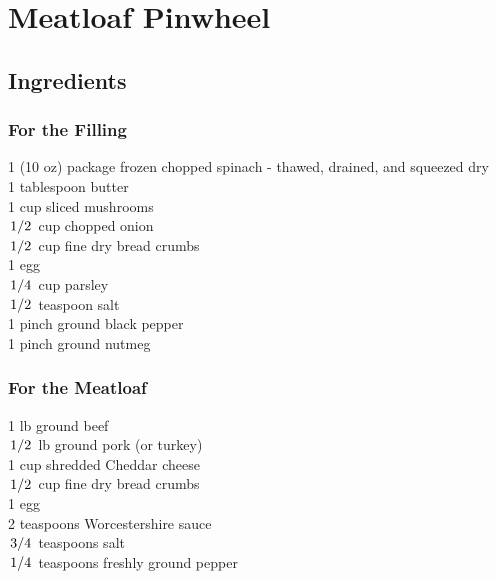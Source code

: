 \documentclass{article}
\begin{document}
\newcommand{\slfrac}[2]{\left.#1\middle/#2\right.}
\newcommand{\degree}{\ensuremath{^\circ}}

\section*{Meatloaf Pinwheel}



\subsection*{Ingredients}
\subsubsection*{For the Filling}

1 (10 oz) package frozen chopped spinach - thawed, drained, and squeezed dry\\
1 tablespoon butter\\
1 cup sliced mushrooms\\
$\slfrac{1}{2}$ cup chopped onion\\
$\slfrac{1}{2}$ cup fine dry bread crumbs\\
1 egg\\
$\slfrac{1}{4}$ cup parsley\\
$\slfrac{1}{2}$ teaspoon salt\\
1 pinch ground black pepper\\
1 pinch ground nutmeg\\

\subsubsection*{For the Meatloaf}

1 lb ground beef\\
$\slfrac{1}{2}$ lb ground pork (or turkey)\\
1 cup shredded Cheddar cheese\\
$\slfrac{1}{2}$ cup fine dry bread crumbs\\
1 egg\\
2 teaspoons Worcestershire sauce\\
$\slfrac{3}{4}$ teaspoons salt\\
$\slfrac{1}{4}$ teaspoons freshly ground pepper\\
\end{document}
